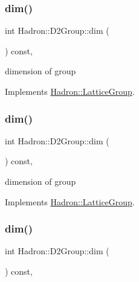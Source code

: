 \subsubsection{\texorpdfstring{dim()}{dim()}\hspace{0.1cm}{\footnotesize\ttfamily [1/3]}}
{\footnotesize\ttfamily int Hadron\+::\+D2\+Group\+::dim (\begin{DoxyParamCaption}{ }\end{DoxyParamCaption}) const\hspace{0.3cm}{\ttfamily [inline]}, {\ttfamily [virtual]}}

dimension of group 

Implements \mbox{\hyperlink{structHadron_1_1LatticeGroup_abd8415698323796ef6a8605796ee3bea}{Hadron\+::\+Lattice\+Group}}.

\mbox{\label{structHadron_1_1D2Group_a937ab7d9b4b21da1331b0c85728f7db9}} 
\subsubsection{\texorpdfstring{dim()}{dim()}\hspace{0.1cm}{\footnotesize\ttfamily [2/3]}}
{\footnotesize\ttfamily int Hadron\+::\+D2\+Group\+::dim (\begin{DoxyParamCaption}{ }\end{DoxyParamCaption}) const\hspace{0.3cm}{\ttfamily [inline]}, {\ttfamily [virtual]}}

dimension of group 

Implements \mbox{\hyperlink{structHadron_1_1LatticeGroup_abd8415698323796ef6a8605796ee3bea}{Hadron\+::\+Lattice\+Group}}.

\mbox{\label{structHadron_1_1D2Group_a937ab7d9b4b21da1331b0c85728f7db9}} 
\subsubsection{\texorpdfstring{dim()}{dim()}\hspace{0.1cm}{\footnotesize\ttfamily [3/3]}}
{\footnotesize\ttfamily int Hadron\+::\+D2\+Group\+::dim (\begin{DoxyParamCaption}{ }\end{DoxyParamCaption}) const\hspace{0.3cm}{\ttfamily [inline]}, {\ttfamily [virtual]}}


